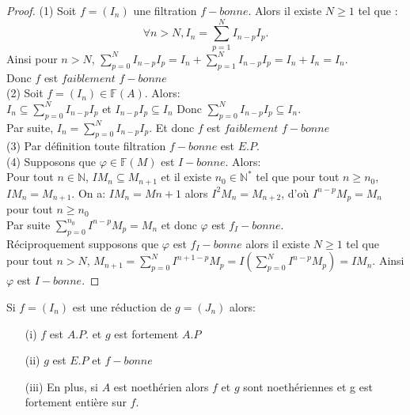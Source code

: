 \begin{proof}
	(1) Soit $f=(I_n)$ une filtration $f-bonne$. Alors il existe $N \geqslant 1$ tel que :
	\[ \forall n > N, I_n = \sum\limits_{p=1}^{N} I_{n-p}I_p. \]
	Ainsi pour $n> N$, $\sum\limits_{p=0}^{N} I_{n-p}I_p =  I_n + \sum\limits_{p=1}^{N} I_{n-p}I_p = I_n + I_n = I_n$. \\
	Donc $f$ est $faiblement$ $f-bonne$ \\
	(2) Soit $f=(I_n) \in \mathbb{F}(A)$. Alors:\\
	$I_n \subseteq \sum\limits_{p=0}^{N} I_{n-p}I_p$ et $ I_{n-p}I_p \subseteq I_n$
	Donc $\sum\limits_{p=0}^{N}I_{n-p}I_p \subseteq I_n$. \\ Par suite, $I_n = \sum\limits_{p=0}^{N} I_{n-p}I_p.$ Et donc $f$ est $faiblement$ $f-bonne$ \\
	(3) Par définition toute filtration $f-bonne$ est $E.P$. \\
	(4) Supposons que $\varphi \in \mathbb{F}(M)$ est $I-bonne$. Alors: \\
	Pour tout $n \in \mathbb{N}$, $IM_n \subseteq M_{n+1}$ et il existe $n_0 \in \mathbb{N}^{*}$ tel que pour tout $n \geqslant n_0$, $IM_n = M_{n+1}$.
	On a: $IM_n=M{n+1}$ alors $I^{2}M_n=M_{n+2}$, d'où $I^{n-p}M_p=M_n$ pour tout $n \geqslant n_0$\\ Par suite $\sum\limits_{p=0}^{n_0}I^{n-p}M_p=M_n$ et donc $\varphi$ est $f_{I}-bonne$. \\
	Réciproquement supposons que $\varphi$ est $f_{I}-bonne$ alors il existe $N \geqslant 1$ tel que pour tout $n> N$, $M_{n+1} = \sum\limits_{p=0}^{N}I^{n+1-p}M_p =I(\sum\limits_{p=0}^{N}I^{n-p}M_p ) = IM_n$. Ainsi $\varphi$ est $I-bonne$.	
	
\end{proof}
\begin{maproposition}
	\label{maprop7}
	Si $f=(I_n)$ est une réduction de $g=(J_n)$ alors:
	\begin{enumerate}
		\item[(i)] $f$ est $A.P.$ et $g$ est fortement $A.P$
		\item[(ii)] $g$ est $E.P$ et $f-bonne$
		\item[(iii)] En plus, si $A$ est noethérien alors $f$ et $g$ sont noethériennes et g est fortement entière sur $f$.
	\end{enumerate}
\end{maproposition}
